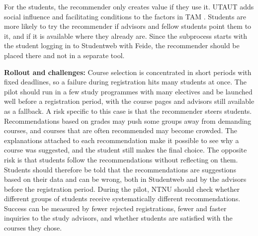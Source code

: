 For the students, the recommender only creates value if they use it. UTAUT adds social influence and facilitating conditions to the factors in TAM \parencite{stair}. Students are more likely to try the recommender if advisors and fellow students point them to it, and if it is available where they already are. Since the subprocess starts with the student logging in to Studentweb with Feide, the recommender should be placed there and not in a separate tool. 

\textbf{Rollout and challenges:}
Course selection is concentrated in short periods with fixed deadlines, so a failure during registration hits many students at once. The pilot should run in a few study programmes with many electives and be launched well before a registration period, with the course pages and advisors still available as a fallback. A risk specific to this case is that the recommender steers students. Recommendations based on grades may push some groups away from demanding courses, and courses that are often recommended may become crowded. The explanations attached to each recommendation make it possible to see why a course was suggested, and the student still makes the final choice. The opposite risk is that students follow the recommendations without reflecting on them. Students should therefore be told that the recommendations are suggestions based on their data and can be wrong, both in Studentweb and by the advisors before the registration period. During the pilot, NTNU should check whether different groups of students receive systematically different recommendations. Success can be measured by fewer rejected registrations, fewer and faster inquiries to the study advisors, and whether students are satisfied with the courses they chose.




